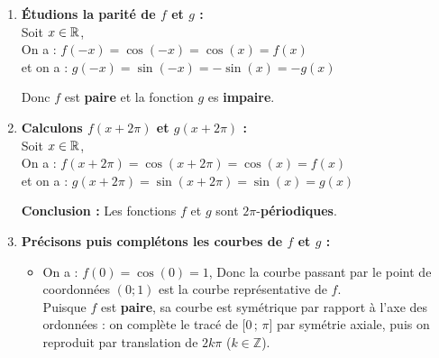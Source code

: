 \documentclass[10pt, a4paper]{article}
\begin{document}
\begin{Solution}[APPLICATION][17]
\begin{enumerate}[leftmargin=*,itemsep=0.5pt]
    \item \textbf{Étudions la parité de $f$ et $g$ :} \\
    Soit $x \in \mathbb{R}$, \\
     On a : \quad   $f(-x) = \cos(-x) = \cos(x) = f(x)$ \\
     et on a : \quad $g(-x) = \sin(-x) = -\sin(x) = -g(x)$
    
    Donc $f$ est \textbf{paire} et la fonction $g$ es \textbf{impaire}.

    \item \textbf{Calculons $f(x+2\pi)$ et $g(x+2\pi)$ :} \\
    Soit $x \in \mathbb{R}$, \\
    On a : \quad  $f(x + 2\pi) = \cos(x + 2\pi) = \cos(x) = f(x)$ \\
    et on a : \quad $g(x + 2\pi) = \sin(x + 2\pi) = \sin(x) = g(x)$ 

    \textbf{Conclusion :} Les fonctions $f$ et $g$ sont $2\pi$-\textbf{périodiques}.

\item \textbf{Précisons puis complétons les courbes de $f$ et $g$ :}

\begin{itemize}[leftmargin=*,itemsep=0.5pt]
    \item On a :   $f(0) = \cos(0)  = 1$, Donc la courbe passant par le point de coordonnées $(0;1)$ est la courbe représentative de $f$. \\
Puisque $f$ est \textbf{paire}, sa courbe est symétrique par rapport à l'axe des ordonnées : on complète le tracé de $\big[0\,;\,\pi\big]$ par symétrie axiale, puis on reproduit par translation de $2k\pi$ ($k \in \mathbb{Z}$).

\begin{center}
\end{center}
\end{itemize}
\end{enumerate}
\end{Solution}
\end{document}
